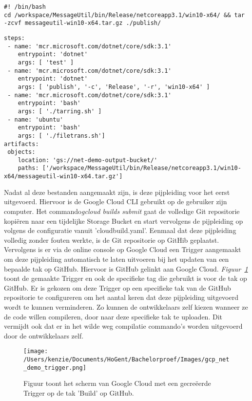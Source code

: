 \begin{lstlisting}
#! /bin/bash
cd /workspace/MessageUtil/bin/Release/netcoreapp3.1/win10-x64/ && tar -zcvf messageutil-win10-x64.tar.gz ./publish/
\end{lstlisting}

\begin{lstlisting}
steps:
 - name: 'mcr.microsoft.com/dotnet/core/sdk:3.1'
    entrypoint: 'dotnet'
    args: [ 'test' ]
 - name: 'mcr.microsoft.com/dotnet/core/sdk:3.1'
    entrypoint: 'dotnet'
    args: [ 'publish', '-c', 'Release', '-r', 'win10-x64' ]
 - name: 'mcr.microsoft.com/dotnet/core/sdk:3.1'
    entrypoint: 'bash'
    args: [ './tarring.sh' ]
 - name: 'ubuntu'
    entrypoint: 'bash'
    args: [ './filetrans.sh']
artifacts:
 objects:
    location: 'gs://net-demo-output-bucket/'
    paths: ['/workspace/MessageUtil/bin/Release/netcoreapp3.1/win10-x64/messageutil-win10-x64.tar.gz']
\end{lstlisting}

Nadat al deze bestanden aangemaakt zijn, is deze pijpleiding voor het eerst uitgevoerd. Hiervoor is de Google Cloud CLI gebruikt op de gebruiker zijn computer. Het commando\emph{gcloud builds submit} gaat de volledige Git repositorie kopiëren naar een tijdelijke Storage Bucket en start vervolgens de pijpleiding op volgens de configuratie vanuit 'cloudbuild.yaml'. Eenmaal dat deze pijpleiding volledig zonder fouten werkte, is de Git repositorie op GitHib geplaatst. Vervolgens is er via de online console op Google Cloud een Trigger aangemaakt om deze pijpleiding automatisch te laten uitvoeren bij het updaten van een bepaalde tak op GitHub. Hiervoor is GitHub gelinkt aan Google Cloud. \emph{Figuur~\ref{fig:GCP_POC_trigger}} toont de gemaakte Trigger en ook de specifieke tag die gebruikt is voor de tak op GitHub. Er is gekozen om deze Trigger op een specifieke tak van de GitHub repositorie te configureren om het aantal keren dat deze pijpleiding uitgevoerd wordt te kunnen verminderen. Zo kunnen de ontwikkelaars zelf kiezen wanneer ze de code willen compileren, door naar deze specifieke tak te uploaden. Dit vermijdt ook dat er in het wilde weg compilatie commando’s worden uitgevoerd door de ontwikkelaars zelf.

\begin{figure}[!htbp]
    \centering
    \texttt{[image: /Users/kenzie/Documents/HoGent/Bachelorproef/Images/gcp\_net\_demo\_trigger.png]}
    \caption{Figuur toont het scherm  van Google Cloud met een gecreëerde Trigger op de tak 'Build' op GitHub.}
    \label{fig:GCP_POC_trigger}
\end{figure}

